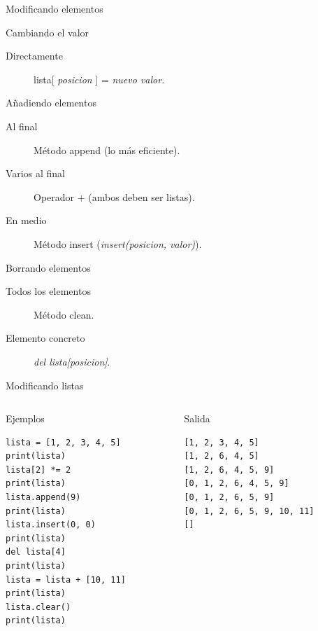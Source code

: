 \documentclass[bigger,unknownkeysallowed]{beamer}
\begin{document}
\begin{frame}[label={sec:org56d42db}]{Modificando elementos}
\begin{block}{Cambiando el valor}
\begin{description}
\item[{Directamente}] lista[ \emph{posicion} ] = \emph{nuevo valor}.
\end{description}
\end{block}

\begin{block}{Añadiendo elementos}
\begin{description}
\item[{Al final}] Método append (lo más eficiente).

\item[{Varios al final}] Operador + (ambos deben ser listas).

\item[{En medio}] Método insert (\emph{insert(posicion, valor)}).
\end{description}
\end{block}

\begin{block}{Borrando elementos}
\begin{description}
\item[{Todos los elementos}] Método clean.

\item[{Elemento concreto}] \emph{del lista[posicion]}.
\end{description}
\end{block}
\end{frame}
\begin{frame}[fragile,label={sec:org406bfdb}]{Modificando listas}
 \begin{columns}[t]
\begin{column}{0.5\columnwidth}
\begin{exampleblock}{Ejemplos}
\begin{verbatim}
lista = [1, 2, 3, 4, 5]
print(lista)
lista[2] *= 2
print(lista)
lista.append(9)
print(lista)
lista.insert(0, 0)
print(lista)
del lista[4]
print(lista)
lista = lista + [10, 11]
print(lista)
lista.clear()
print(lista)
\end{verbatim}
\end{exampleblock}
\end{column}

\begin{column}{0.5\columnwidth}
\begin{block}{Salida}
\scriptsize
\begin{verbatim}
[1, 2, 3, 4, 5]
[1, 2, 6, 4, 5]
[1, 2, 6, 4, 5, 9]
[0, 1, 2, 6, 4, 5, 9]
[0, 1, 2, 6, 5, 9]
[0, 1, 2, 6, 5, 9, 10, 11]
[]
\end{verbatim}
\end{block}
\end{column}
\end{columns}
\end{frame}
\end{document}
